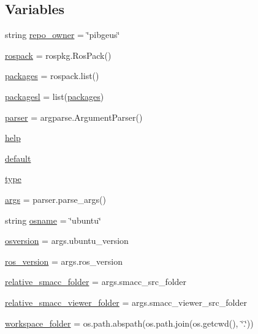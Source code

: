 \subsection*{Variables}
\begin{DoxyCompactItemize}
\item 
string \hyperlink{namespacegenerate__debs_a74472455382c9d55ee0d75c6df6bde74}{repo\+\_\+owner} = \char`\"{}pibgeus\char`\"{}
\item 
\hyperlink{namespacegenerate__debs_a609fa33c1ebbff173ec90524eeb7b49d}{rospack} = rospkg.\+Ros\+Pack()
\item 
\hyperlink{namespacegenerate__debs_a40d4732827c5678f3f48354238245e1d}{packages} = rospack.\+list()
\item 
\hyperlink{namespacegenerate__debs_acac340506bc1d8ca0d0881b9c00bfea2}{packagesl} = list(\hyperlink{namespacegenerate__debs_a40d4732827c5678f3f48354238245e1d}{packages})
\item 
\hyperlink{namespacegenerate__debs_a4a9ae4bb85fc62d7973ea3d09ced6c26}{parser} = argparse.\+Argument\+Parser()
\item 
\hyperlink{namespacegenerate__debs_ab09f4294da5036d5f6881672de9ed9c7}{help}
\item 
\hyperlink{namespacegenerate__debs_a3d67a92b7eb3a59c397dc9fdd1c67558}{default}
\item 
\hyperlink{namespacegenerate__debs_a50bc9a7ecac9584553e089a448bcde58}{type}
\item 
\hyperlink{namespacegenerate__debs_a75f9143e38df82d83b2e8a6f99cae02c}{args} = parser.\+parse\+\_\+args()
\item 
string \hyperlink{namespacegenerate__debs_ad06322332de29cb27a40152d0cccc2ca}{osname} = \char`\"{}ubuntu\char`\"{}
\item 
\hyperlink{namespacegenerate__debs_afd02fe6ead63bc5db5d3c3b9eb973b62}{osversion} = args.\+ubuntu\+\_\+version
\item 
\hyperlink{namespacegenerate__debs_af69f35c2a04a4cc8bd6b9805ab436872}{ros\+\_\+version} = args.\+ros\+\_\+version
\item 
\hyperlink{namespacegenerate__debs_abf6925bd06ac1da3981fe638eefb5a61}{relative\+\_\+smacc\+\_\+folder} = args.\+smacc\+\_\+src\+\_\+folder
\item 
\hyperlink{namespacegenerate__debs_a22d892b78adfce583710d78737eb4747}{relative\+\_\+smacc\+\_\+viewer\+\_\+folder} = args.\+smacc\+\_\+viewer\+\_\+src\+\_\+folder
\item 
\hyperlink{namespacegenerate__debs_acb69863b90257249a30e43ebacfb8bd8}{workspace\+\_\+folder} = os.\+path.\+abspath(os.\+path.\+join(os.\+getcwd(), \char`\"{}.\char`\"{}))

\end{DoxyCompactItemize}
